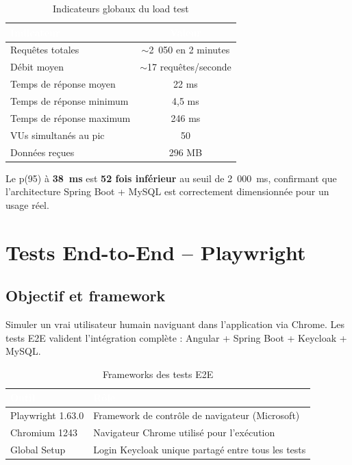 \documentclass[12pt,a4paper]{report}
\newcommand{\thead}[1]{\cellcolor{tablehead}\textcolor{white}{\textbf{#1}}}
\begin{document}
\begin{table}[H]
  \centering
  \caption{Indicateurs globaux du load test}
  \label{tab:indicateurs_perf}
  \begin{tabularx}{\textwidth}{|l|c|}
    \hline
    \thead{Indicateur} & \thead{Valeur} \\
    \hline
    Requêtes totales & $\sim$2~050 en 2 minutes \\
    Débit moyen & $\sim$17 requêtes/seconde \\
    Temps de réponse moyen & 22 ms \\
    Temps de réponse minimum & 4,5 ms \\
    Temps de réponse maximum & 246 ms \\
    VUs simultanés au pic & 50 \\
    Données reçues & 296 MB \\
    \hline
  \end{tabularx}
\end{table}

Le p(95) à \textbf{38~ms} est \textbf{52 fois inférieur} au seuil de
2~000~ms, confirmant que l'architecture Spring Boot + MySQL est correctement
dimensionnée pour un usage réel.

\section{Tests End-to-End -- Playwright}
\label{sec:ch8-e2e}

\subsection{Objectif et framework}

Simuler un vrai utilisateur humain naviguant dans l'application via
Chrome. Les tests E2E valident l'intégration complète :
Angular + Spring Boot + Keycloak + MySQL.

\begin{table}[H]
  \centering
  \caption{Frameworks des tests E2E}
  \label{tab:fw_e2e}
  \begin{tabularx}{\textwidth}{|l|Y|}
    \hline
    \thead{Outil} & \thead{Rôle} \\
    \hline
    Playwright 1.63.0 & Framework de contrôle de navigateur (Microsoft) \\
    Chromium 1243 & Navigateur Chrome utilisé pour l'exécution \\
    Global Setup & Login Keycloak unique partagé entre tous les tests \\
    \hline
  \end{tabularx}
\end{table}
\end{document}
